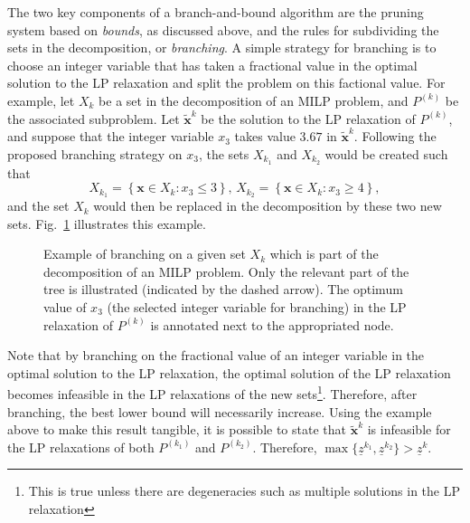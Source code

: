 The two key components of a branch-and-bound algorithm are the pruning system based on \emph{bounds}, as discussed above, and the rules for subdividing the sets in the decomposition, or \emph{branching}.
A simple strategy for branching is to choose an integer variable that has taken a fractional value in the optimal solution to the LP relaxation and split the problem on this factional value.
For example, let $X_k$ be a set in the decomposition of an MILP problem, and $P^{(k)}$ be the associated subproblem.
Let $\widetilde{\bm{x}}^{k}$ be the solution to the LP relaxation of $P^{(k)}$, and suppose that the integer variable $x_3$ takes value $3.67$ in $\widetilde{\bm{x}}^{k}$.
Following the proposed branching strategy on $x_3$, the sets $X_{k_1}$ and $X_{k_2}$ would be created such that \[
X_{k_1} = \left\{ \bm{x} \in X_k : x_3 \le 3 \right\} ,\, X_{k_2} = \left\{ \bm{x}\in X_k : x_3 \ge 4 \right\} 
,\] and the set $X_k$ would then be replaced in the decomposition by these two new sets.
Fig.~\ref{fig:branching-example} illustrates this example.

\begin{figure}[h]
    \centering
    \caption{Example of branching on a given set $X_k$ which is part of the decomposition of an MILP problem. Only the relevant part of the tree is illustrated (indicated by the dashed arrow). The optimum value of $x_3$ (the selected integer variable for branching) in the LP relaxation of $P^{(k)}$ is annotated next to the appropriated node.}
    \label{fig:branching-example}
\end{figure}

Note that by branching on the fractional value of an integer variable in the optimal solution to the LP relaxation, the optimal solution of the LP relaxation becomes infeasible in the LP relaxations of the new sets\footnote{This is true unless there are degeneracies such as multiple solutions in the LP relaxation}.
Therefore, after branching, the best lower bound will necessarily increase.
Using the example above to make this result tangible, it is possible to state that $\widetilde{\bm{x}}^{k}$ is infeasible for the LP relaxations of both $P^{(k_1)}$ and $P^{(k_2)}$.
Therefore, $\max\{\underline{z}^{k_1},\underline{z}^{k_2}\} > \underline{z}^{k}$.

